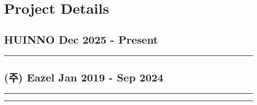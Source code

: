 \section{Project Details}
\subsection*{HUINNO \hfill Dec 2025 - Present}

\noindent\rule{16cm}{0.4pt}
\subsection*{(주) Eazel \hfill Jan 2019 - Sep 2024}

\noindent\rule{8cm}{0.4pt}

\noindent\rule{8cm}{0.4pt}

